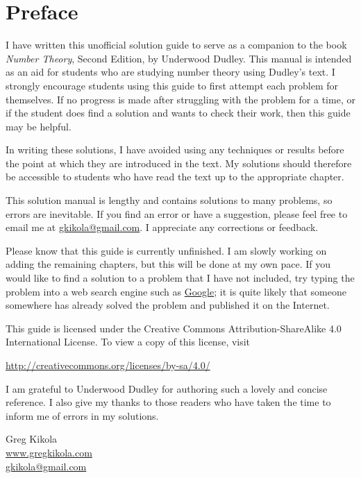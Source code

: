 \chapter{Preface}

I have written this unofficial solution guide to serve as a companion
to the book {\em Number Theory}, Second Edition, by Underwood
Dudley. This manual is intended as an aid for students who are
studying number theory using Dudley's text. I strongly encourage
students using this guide to first attempt each problem for
themselves. If no progress is made after struggling with the problem
for a time, or if the student does find a solution and wants to check
their work, then this guide may be helpful.

In writing these solutions, I have avoided using any techniques or
results before the point at which they are introduced in the text. My
solutions should therefore be accessible to students who have read the
text up to the appropriate chapter.

This solution manual is lengthy and contains solutions to many
problems, so errors are inevitable. If you find an error or have a
suggestion, please feel free to email me at
\href{mailto:gkikola@gmail.com}{gkikola@gmail.com}. I appreciate any
corrections or feedback.

Please know that this guide is currently unfinished. I am slowly
working on adding the remaining chapters, but this will be done at my
own pace. If you would like to find a solution to a problem that I
have not included, try typing the problem into a web search engine
such as \href{https://www.google.com/}{Google}; it is quite likely
that someone somewhere has already solved the problem and published it
on the Internet.

This guide is licensed under the Creative Commons
Attribution-ShareAlike 4.0 International License. To view a copy of
this license, visit
\begin{center}
  \href{http://creativecommons.org/licenses/by-sa/4.0/}
  {http://creativecommons.org/licenses/by-sa/4.0/}
\end{center}

I am grateful to Underwood Dudley for authoring such a lovely and
concise reference. I also give my thanks to those readers who have
taken the time to inform me of errors in my solutions.

\begin{flushright}
  Greg Kikola\\
  \href{https://www.gregkikola.com/}{www.gregkikola.com}\\
  \href{mailto:gkikola@gmail.com}{gkikola@gmail.com}
\end{flushright}
